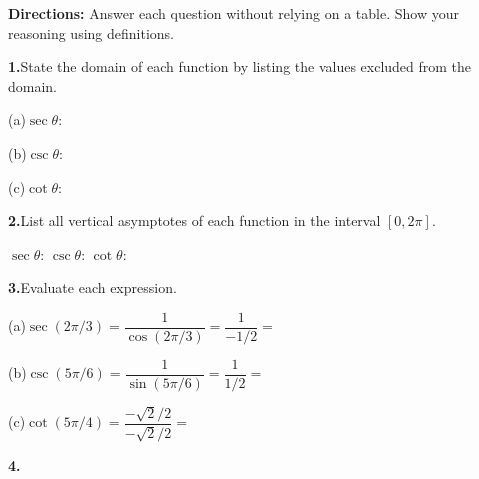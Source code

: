 \documentclass[10pt]{article}
\begin{document}
\vspace{0.08in}

\begin{tcolorbox}[colback=white, colframe=black!40,
    title=\textbf{Tier A --- Apply},
    fonttitle=\bfseries, arc=2mm, left=3mm, right=3mm, top=2mm, bottom=2mm]

\textbf{Directions:} Answer each question without relying on a table. Show
your reasoning using definitions.

\vspace{6pt}
\textbf{1.}\quad State the domain of each function by listing the values excluded
from the domain.

\vspace{4pt}
(a)\quad $\sec\theta$: 

\vspace{4pt}
(b)\quad $\csc\theta$: 

\vspace{4pt}
(c)\quad $\cot\theta$: 

\vspace{8pt}
\textbf{2.}\quad List all vertical asymptotes of each function in the interval $[0, 2\pi]$.

\vspace{4pt}
$\sec\theta$:  \quad
$\csc\theta$:  \quad
$\cot\theta$: 

\vspace{8pt}
\textbf{3.}\quad Evaluate each expression.

\vspace{4pt}
(a)\quad $\sec(2\pi/3) = \dfrac{1}{\cos(2\pi/3)} = \dfrac{1}{-1/2} = $ 

\vspace{6pt}
(b)\quad $\csc(5\pi/6) = \dfrac{1}{\sin(5\pi/6)} = \dfrac{1}{1/2} = $ 

\vspace{6pt}
(c)\quad $\cot(5\pi/4) = \dfrac{-\sqrt{2}/2}{-\sqrt{2}/2} = $ 

\vspace{8pt}
\textbf{4.}\quad {}

\end{tcolorbox}
\end{document}
